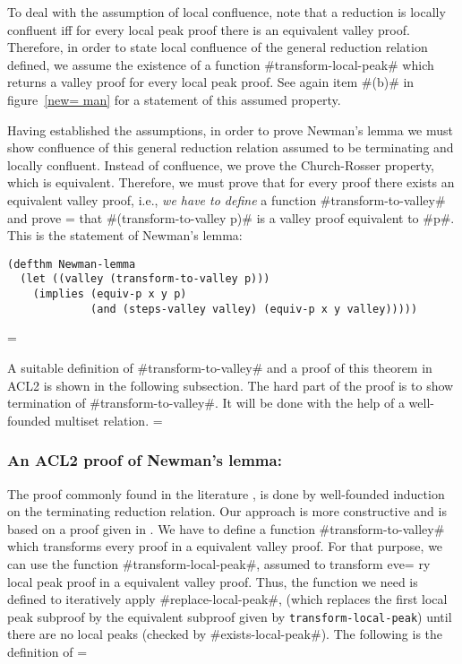 \documentclass[11pt]{llncs}
\begin{document}
{To deal with the assumption of local confluence, note that a
reduction is locally confluent iff for every local peak proof there is
an equivalent valley proof. Therefore, in order to state local
confluence of the general reduction relation defined, we assume the
existence of a function #transform-local-peak# which returns a valley
proof for every local peak proof. See again item #(b)# in figure~\ref{new=
man}
for a statement of this assumed property.


Having established the assumptions, in order to prove Newman's lemma we
must show confluence of this general reduction relation assumed to
be terminating and locally confluent. Instead of confluence, we prove
the Church-Rosser property, which is equivalent. Therefore, we must
prove that for every proof there exists an equivalent valley proof,
i.e., {\em we have to define} a function #transform-to-valley# and prove =
that
#(transform-to-valley p)# is a valley proof equivalent to #p#. This is
the statement of Newman's lemma:

\begin{verbatim}
(defthm Newman-lemma
  (let ((valley (transform-to-valley p)))
    (implies (equiv-p x y p)
             (and (steps-valley valley) (equiv-p x y valley)))))
\end{verbatim}
 =

A suitable definition of #transform-to-valley# and a proof of this
theorem in ACL2 is shown in the following subsection. The hard part of
the proof is to show termination of #transform-to-valley#. It will be
done with the help of a well-founded multiset relation.  =

\label{newman-stated}

\subsubsection{An ACL2 proof of Newman's lemma:}

The proof commonly found in the literature \cite{Nipkow}, is done by
well-founded induction on the terminating reduction relation. Our
approach is more constructive and is based on a proof given in
\cite{Klo92}. We have to define a function #transform-to-valley# which
transforms every proof in a equivalent valley proof. For that purpose,
we can use the function #transform-local-peak#, assumed  to transform eve=
ry
local peak proof in a equivalent valley proof. Thus, the function we
need is defined to iteratively apply #replace-local-peak#, (which
replaces the first local peak subproof by the equivalent subproof given
by {\tt trans\-form-lo\-cal\--peak}) until there are no local peaks
(checked by #exists-local-peak#). The following is the definition of =

}
\end{document}

